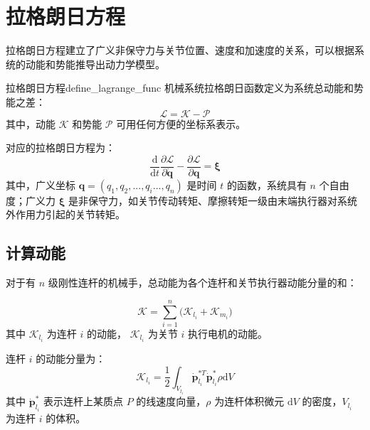\documentclass[cn,11pt,chinese,blue,bibstyle=ieeetr]{elegantbook}
\begin{document}
\section{拉格朗日方程}

拉格朗日方程建立了广义非保守力与关节位置、速度和加速度的关系，可以根据系统的动能和势能推导出动力学模型。

\begin{definition}{拉格朗日方程}{define_lagrange_func}
机械系统拉格朗日函数定义为系统总动能和势能之差：
\begin{equation}\label{robot_lagrange_func}
\mathcal{L} = \mathcal{K} - \mathcal{P}
\end{equation}
其中，动能 $\mathcal{K}$ 和势能 $\mathcal{P}$ 可用任何方便的坐标系表示。

对应的拉格朗日方程为：
\begin{equation}\label{robot_lagrange_kinematics_equation}
\frac{\mathrm{d}}{\mathrm{d}t} \frac{\partial \mathcal{L}}{\partial \dot{\bm{q}}} - \frac{\partial \mathcal{L}}{\partial \bm{q}} = \bm{\xi}
\end{equation}
其中，广义坐标 $\bm{q} = (q_1, q_2, ..., q_i ..., q_n)$ 是时间 $t$ 的函数，系统具有 $n$ 个自由度；广义力 $\bm{\xi}$ 是非保守力，如关节传动转矩、摩擦转矩一级由末端执行器对系统外作用力引起的关节转矩。
\end{definition}


\subsection{计算动能}

对于有 $n$ 级刚性连杆的机械手，总动能为各个连杆和关节执行器动能分量的和：

\begin{equation}\label{total_kinetic_energy_of_rigid_manipulator}
	\mathcal{K} = \sum_{i = 1}^{n} \big( \mathcal{K}_{l_i} + \mathcal{K}_{m_i} \big)
\end{equation}
其中 $\mathcal{K}_{l_i}$ 为连杆 $i$ 的动能， $\mathcal{K}_{l_i}$ 为关节 $i$ 执行电机的动能。

连杆 $i$ 的动能分量为：
\begin{equation}\label{link_kinetic_energy_equation}
	\mathcal{K}_{l_i} = \frac{1}{2} \int_{V_{l_i}} { {{\bm{\dot p}}_{l_i}^{*T}} {{\bm{\dot p}}_{l_i}^*} \rho \mathrm{d}V }
\end{equation}
其中 $\dot{\bm{p}}_{l_i}^*$ 表示连杆上某质点 $P$ 的线速度向量，$\rho$ 为连杆体积微元 $\mathrm{d}V$ 的密度，$V_{l_i}$ 为连杆 $i$ 的体积。
\end{document}
